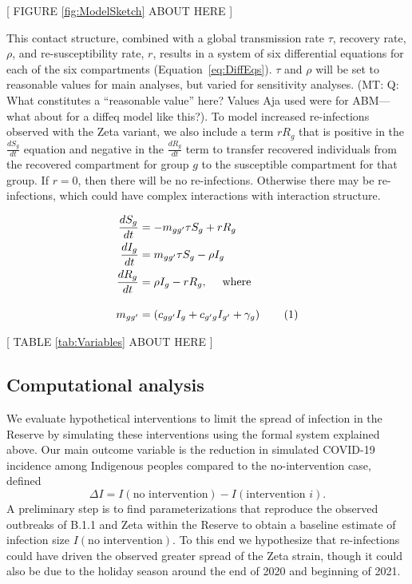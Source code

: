 \documentclass[
  letterpaper,
  abstract]{scrartcl}
\newcommand{\mt}[1]{{\textcolor{myorange} {({\tiny MT:} #1)}}}
\newcommand\numberthis{\addtocounter{equation}{1}\tag{\theequation}}
\begin{document}
\vspace{0.5em}
\begin{center}
{[ FIGURE \ref{fig:ModelSketch} ABOUT HERE ]} \\
\end{center}

This contact structure, combined with a global transmission rate $\tau$,
recovery rate, $\rho$, and re-susceptibility rate, $r$, results in a system of
six differential equations for each of the six compartments
(Equation~\ref{eq:DiffEqs}). $\tau$ and $\rho$ will be set to reasonable values
for main analyses, but varied for sensitivity analyses.  \mt{Q: What constitutes
a ``reasonable value'' here? Values Aja used were for ABM---what about for a
diffeq model like this?}. To model increased re-infections observed with the
Zeta variant, we also include a term $r R_g$ that is positive in the
$\frac{dS_g}{dt}$ equation and negative in the $\frac{dR_g}{dt}$ term to
transfer recovered individuals from the recovered compartment for group $g$ to
the susceptible compartment for that group. If $r=0$, then there will be no
re-infections. Otherwise there may be re-infections, which could have complex
interactions with interaction structure.

\begin{align*}
  \frac{dS_g}{dt} &= -m_{gg'} \tau S_g + r R_g   \\
  \frac{dI_g}{dt} &=  m_{gg'} \tau S_g - \rho I_g \\
  \frac{dR_g}{dt} &= \rho I_g - r R_g,\quad\text{ where } \\[1em]
          m_{gg'} &= \left(c_{gg'} I_g + c_{g'g}I_{g'} + \gamma_g \right)
    \numberthis \label{eq:DiffEqs}
\end{align*}
\noindent


\vspace{0.5em}
\begin{center}
{[ TABLE \ref{tab:Variables} ABOUT HERE ]} \\
\end{center}



\subsection{Computational analysis}

We evaluate hypothetical interventions to limit the spread of
infection in the Reserve by simulating these interventions using the formal
system explained above. Our main outcome variable is the reduction in simulated
COVID-19 incidence among Indigenous peoples compared to the no-intervention
case, defined 
\begin{equation}
  \Delta I = I(\text{no intervention}) - I(\text{intervention } i).
\end{equation}
\noindent
A preliminary step is to find parameterizations that reproduce the observed
outbreaks of B.1.1 and Zeta within the Reserve to obtain a baseline estimate of
infection size $I(\text{no intervention})$. 
To this end we hypothesize that re-infections could have driven the observed
greater spread of the Zeta strain, though it could also be due to the holiday
season around the end of 2020 and beginning of 2021. 
\end{document}
